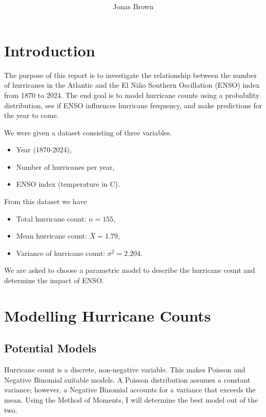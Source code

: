 \documentclass[11pt,spanish]{report}
\title{
    \begin{center}
        {\reallybigtenb{MTH1004}}
        
        {\reallybigtenb{Analysis of Atlantic Hurricanes and ENSO Effects}}
    \end{center}
}
\author{Jonas Brown}
\date{}
\begin{document}
    \maketitle
    
    \chapter{Introduction}

    The purpose of this report is to investigate the relationship between the number of hurricanes in the Atlantic and the El Ni\~no Southern Oscillation (ENSO) index from 1870 to 2024. The end goal is to model hurricane counts using a probability distribution, see if ENSO influences hurricane frequency, and make predictions for the year to come.

    We were given a dataset consisting of three variables.
    
    \begin{itemize}
      \item Year (1870-2024),
      \item Number of hurricanes per year,
      \item ENSO index (temperature in \textdegree C).
    \end{itemize}

    From this dataset we have
    \begin{itemize}
        \item Total hurricane count: $n=155$,
        \item Mean hurricane count: $\bar{X}=1.79$,
        \item Variance of hurricane count: $\sigma^{2}=2.204$.
    \end{itemize}

    We are asked to choose a parametric model to describe the hurricane count and determine the impact of ENSO.

    \chapter{Modelling Hurricane Counts}

    \section{Potential Models}

    Hurricane count is a discrete, non-negative variable. This makes Poisson and Negative Binomial suitable models. A Poisson distribution assumes a constant variance; however, a Negative Binomial accounts for a variance that exceeds the mean. Using the Method of Moments, I will determine the best model out of the two.
    
\end{document}
